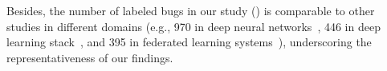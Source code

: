 Besides, the number of labeled bugs in our study (\numbug) is comparable to other \bfp studies in different domains (e.g., 970 in deep neural networks~\cite{IslamPNR20}, 446 in deep learning stack~\cite{Huang0WCM023}, and 395 in federated learning systems~\cite{DuCC0C023}), underscoring the representativeness of our findings.

